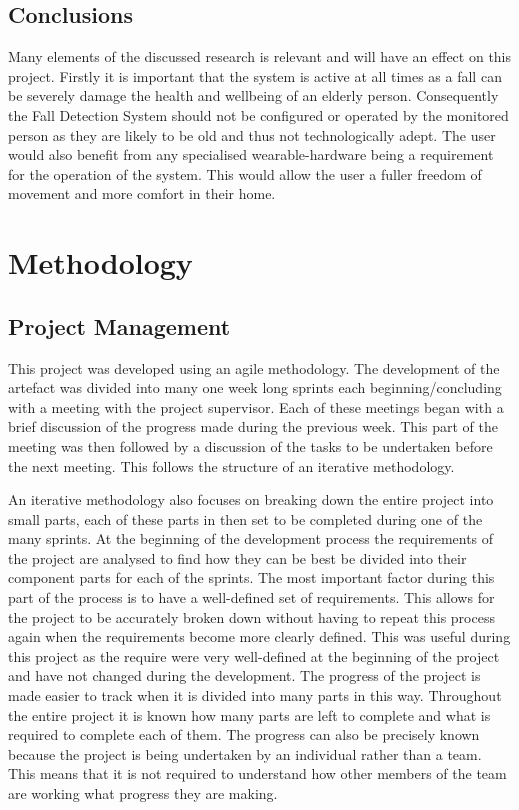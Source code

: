 \documentclass[11pt,a4paper]{report}
\begin{document}
\section{Conclusions}
Many elements of the discussed research is relevant and will have an effect on this project. Firstly it is important that the system is active at all times as a fall can be severely damage the health and wellbeing of an elderly person. Consequently the Fall Detection System should not be configured or operated by the monitored person as they are likely to be old and thus not technologically adept. The user would also benefit from any specialised wearable-hardware being a requirement for the operation of the system. This would allow the user a fuller freedom of movement and more comfort in their home.

\chapter{Methodology}

\section{Project Management}%
This project was developed using an agile methodology. The development of the artefact was divided into many one week long sprints each beginning/concluding with a meeting with the project supervisor. Each of these meetings began with a brief discussion of the progress made during the previous week. This part of the meeting was then followed by a discussion of the tasks to be undertaken before the next meeting. This follows the structure of an iterative methodology.

An iterative methodology also focuses on breaking down the entire project into small parts, each of these parts in then set to be completed during one of the many sprints. At the beginning of the development process the requirements of the project are analysed to find how they can be best be divided into their component parts for each of the sprints. The most important factor during this part of the process is to have a well-defined set of requirements. This allows for the project to be accurately broken down without having to repeat this process again when the requirements become more clearly defined. This was useful during this project as the require were very well-defined at the beginning of the project and have not changed during the development. The progress of the project is made easier to track when it is divided into many parts in this way. Throughout the entire project it is known how many parts are left to complete and what is required to complete each of them. The progress can also be precisely known because the project is being undertaken by an individual rather than a team. This means that it is not required to understand how other members of the team are working what progress they are making.
\end{document}
